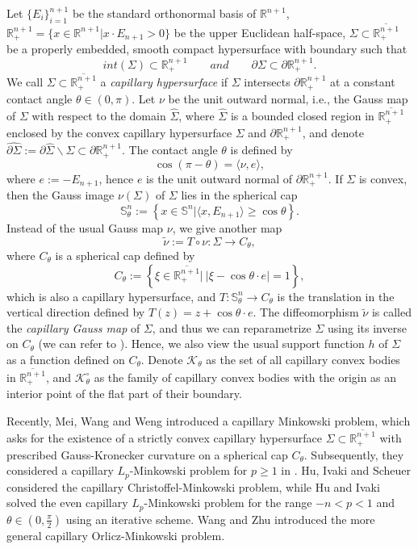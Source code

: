 \documentclass[11pt]{amsart}
\newcommand{\uS}{\mathbb{S}^{n}}
\def\R{{\mathfrak R}}
\def\R{\mathbb R}
\def\S{\mathbb S}
\numberwithin{equation} {section}
\numberwithin{equation}{section}
\begin{document}
Let $\{E_i\}_{i=1}^{n+1}$ be the standard orthonormal basis of $\R^{n+1}$, $\R^{n+1}_{+}=\{x\in\R^{n+1}| x\cdot E_{n+1}>0\}$ be the upper Euclidean half-space, $\Sigma\subset\overline{\R^{n+1}_{+}}$ be a properly embedded, smooth compact hypersurface with boundary such that
$$int(\Sigma)\subset\R^{n+1}_{+}\qquad and \qquad\partial\Sigma\subset\partial\R^{n+1}_{+}.$$
We call $\Sigma\subset\overline{\R^{n+1}_{+}}$ a {\emph{capillary hypersurface}} if $\Sigma$ intersects $\partial\R^{n+1}_{+}$ at a constant contact angle $\theta\in (0,\pi)$. Let $\nu$ be the unit outward normal, i.e., the Gauss map of $\Sigma$ with respect to the domain $\hat{\Sigma}$, where $\hat{\Sigma}$ is a bounded closed region in $\overline{\R^{n+1}_{+}}$ enclosed by the convex capillary hypersurface $\Sigma$ and $\partial\R^{n+1}_{+}$, and denote $\hat{\partial\Sigma}:=\partial\hat{\Sigma}\backslash\Sigma\subset\partial\R^{n+1}_{+}$. The contact angle $\theta$ is defined by 
$$\cos(\pi-\theta) = \langle \nu , e\rangle,$$
where $e:= -E_{n+1}$, hence $e$ is the unit outward normal of $\partial\R^{n+1}_{+}$. If $\Sigma$ is convex, then the Gauss image $\nu(\Sigma)$ of $\Sigma$ lies in the spherical cap
$$\S^n_{\theta}:=\left\{x\in\uS | \langle x, E_{n+1}\rangle \geq \cos\theta\right\}.$$
Instead of the usual Gauss map $\nu$, we give another map
$$\tilde{\nu}:= T \circ \nu: \Sigma\to C_{\theta},$$
where $C_{\theta}$ is a spherical cap defined by
$$C_{\theta}:= \left\{\xi\in\overline{\R^{n+1}_{+}} |~ |\xi-\cos\theta\cdot e|=1\right\},$$
which is also a capillary hypersurface, and $T: \S^n_{\theta}\to C_{\theta}$ is the translation in the vertical direction defined by $T(z)=z+\cos\theta\cdot e$. The diffeomorphism $\tilde{\nu}$ is called the {\emph{capillary Gauss map}} of $\Sigma$, and thus we can reparametrize $\Sigma$ using its inverse on $C_{\theta}$ (we can refer to \cite[Fig. 1]{MWW25a}). Hence, we also view the usual support function $h$ of $\Sigma$ as a function defined on $C_{\theta}$. 
Denote $\mathcal{K}_{\theta}$ as the set of all capillary convex bodies in $\overline{\R^{n+1}_{+}}$, and $\mathcal{K}^{\circ}_{\theta}$ as the family of capillary convex bodies with the origin as an interior point of the flat part of their boundary.

Recently, Mei, Wang and Weng \cite{MWW25a} introduced a capillary Minkowski problem, which asks for the existence of a strictly convex capillary hypersurface $\Sigma\subset\overline{\R^{n+1}_{+}}$ with prescribed Gauss-Kronecker curvature on a spherical cap $C_{\theta}$. Subsequently, they considered a capillary $L_p$-Minkowski problem for $p\geq 1$ in \cite{MWW25b}. Hu, Ivaki and Scheuer \cite{HIS25} considered the capillary Christoffel-Minkowski problem, while Hu and Ivaki \cite{HI25} solved the even capillary $L_p$-Minkowski problem for the range $-n< p < 1$ and $\theta\in (0, \frac{\pi}{2})$ using an iterative scheme. Wang and Zhu \cite{WZ25} introduced the more general capillary Orlicz-Minkowski problem.
\end{document}

